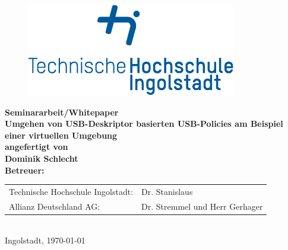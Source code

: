 
\begin{titlepage}

\phantom{tmpText}

\vspace{1cm}

\begin{figure}[h!]
\centering
\includegraphics[width=\textwidth]{bilder/thi_logo_cropped.pdf}
\end{figure}

  \begin{center}

    
    
    \textbf{{\large Seminararbeit/Whitepaper} \\[3ex]
    {\LARGE Umgehen von USB-Deskriptor basierten USB-Policies am Beispiel einer virtuellen Umgebung} \\[1ex]
    \vfill
    angefertigt von \\
    Dominik Schlecht \\[2ex] %
    \vfill
    Betreuer:} \\%
    \begin{tabular}{ll}
      Technische Hochschule Ingolstadt: & Dr. Stanislaus \\
      Allianz Deutschland AG: & Dr. Stremmel und Herr Gerhager
    \end{tabular} \\[2ex]
    \vfill
    Ingolstadt, \today
  \end{center}
\end{titlepage}

